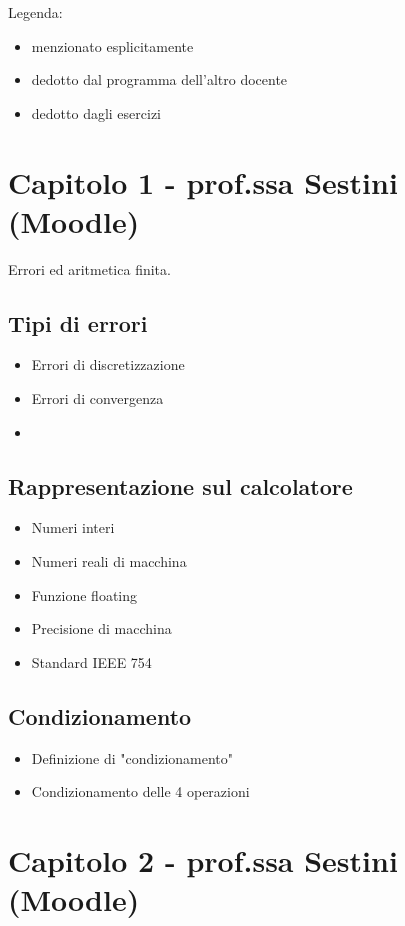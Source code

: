 \documentclass[a4paper, 12pt]{article}
\begin{document}
\noindent Legenda:
	\begin{itemize}
		\item menzionato esplicitamente
		\color{blue} \item{dedotto dal programma dell'altro docente}
		\color{green} \item {dedotto dagli esercizi}
	\end{itemize}

\section{Capitolo 1 - prof.ssa Sestini (Moodle)}

Errori ed aritmetica finita.

\subsection{Tipi di errori}
	\begin{itemize}
		\item Errori di discretizzazione
		\item Errori di convergenza
		\item \color{blue}{Errori di round-off}
	\end{itemize}

\subsection{Rappresentazione sul calcolatore}
	\begin{itemize}
		\item Numeri interi
		\item Numeri reali di macchina
		\item Funzione floating
		\item Precisione di macchina
		\item Standard IEEE 754
	\end{itemize}

\subsection{Condizionamento}
	\begin{itemize}
		\item Definizione di "condizionamento"
		\item Condizionamento delle 4 operazioni
	\end{itemize}

\newpage

\section{Capitolo 2 - prof.ssa Sestini (Moodle)}
\end{document}
